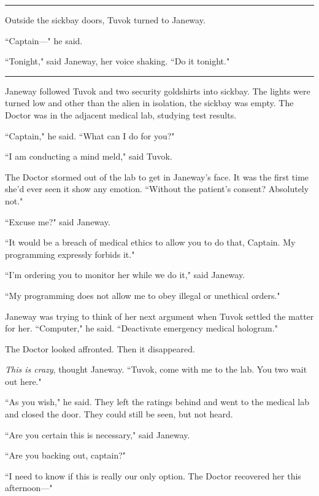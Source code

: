 \documentclass[twoside,letterpaper,12pt]{memoir}
\begin{document}
\begin{center}\rule{3cm}{0.4 pt}\end{center} 

Outside the sickbay doors, Tuvok turned to Janeway. 

``Captain---" he said. 

``Tonight," said Janeway, her voice shaking. ``Do it tonight." 

\begin{center}\rule{3cm}{0.4 pt}\end{center} 

Janeway followed Tuvok and two security goldshirts into sickbay. The lights were turned low and other than the alien in isolation, the sickbay was empty. The Doctor was in the adjacent medical lab, studying test results. 

``Captain," he said. ``What can I do for you?" 

``I am conducting a mind meld," said Tuvok. 

The Doctor stormed out of the lab to get in Janeway's face. It was the first time she'd ever seen it show any emotion. ``Without the patient's consent? Absolutely not." 

``Excuse me?" said Janeway. 

``It would be a breach of medical ethics to allow you to do that, Captain. My programming expressly forbids it." 

``I'm ordering you to monitor her while we do it," said Janeway. 

``My programming does not allow me to obey illegal or unethical orders." 

Janeway was trying to think of her next argument when Tuvok settled the matter for her. ``Computer," he said. ``Deactivate emergency medical hologram." 

The Doctor looked affronted. Then it disappeared. 

\textit{This is crazy}, thought Janeway. ``Tuvok, come with me to the lab. You two wait out here." 

``As you wish," he said. They left the ratings behind and went to the medical lab and closed the door. They could still be seen, but not heard. 

``Are you certain this is necessary," said Janeway. 

``Are you backing out, captain?" 

``I need to know if this is really our only option. The Doctor recovered her this afternoon---" 
\end{document}
